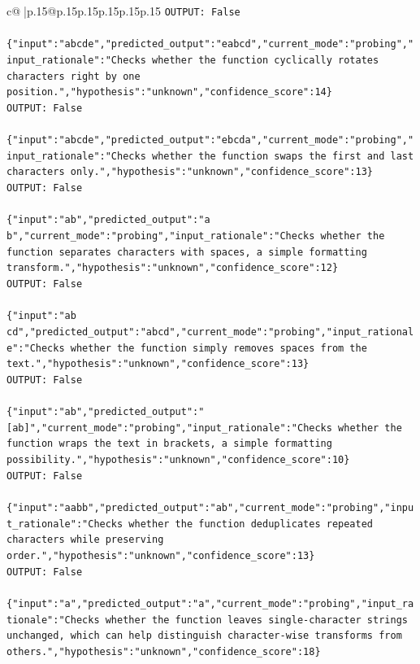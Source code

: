 \documentclass{article}
\begin{document}
{\begin{supertabular}{c@{$\;$}|p{.15\linewidth}@{}p{.15\linewidth}p{.15\linewidth}p{.15\linewidth}p{.15\linewidth}p{.15\linewidth}}
{{{\texttt{OUTPUT: False} \\
\\ 
\texttt{\{"input":"abcde","predicted\_output":"eabcd","current\_mode":"probing","input\_rationale":"Checks whether the function cyclically rotates characters right by one position.","hypothesis":"unknown","confidence\_score":14\}} \\
\texttt{OUTPUT: False} \\
\\ 
\texttt{\{"input":"abcde","predicted\_output":"ebcda","current\_mode":"probing","input\_rationale":"Checks whether the function swaps the first and last characters only.","hypothesis":"unknown","confidence\_score":13\}} \\
\texttt{OUTPUT: False} \\
\\ 
\texttt{\{"input":"ab","predicted\_output":"a b","current\_mode":"probing","input\_rationale":"Checks whether the function separates characters with spaces, a simple formatting transform.","hypothesis":"unknown","confidence\_score":12\}} \\
\texttt{OUTPUT: False} \\
\\ 
\texttt{\{"input":"ab cd","predicted\_output":"abcd","current\_mode":"probing","input\_rationale":"Checks whether the function simply removes spaces from the text.","hypothesis":"unknown","confidence\_score":13\}} \\
\texttt{OUTPUT: False} \\
\\ 
\texttt{\{"input":"ab","predicted\_output":"{[}ab{]}","current\_mode":"probing","input\_rationale":"Checks whether the function wraps the text in brackets, a simple formatting possibility.","hypothesis":"unknown","confidence\_score":10\}} \\
\texttt{OUTPUT: False} \\
\\ 
\texttt{\{"input":"aabb","predicted\_output":"ab","current\_mode":"probing","input\_rationale":"Checks whether the function deduplicates repeated characters while preserving order.","hypothesis":"unknown","confidence\_score":13\}} \\
\texttt{OUTPUT: False} \\
\\ 
\texttt{\{"input":"a","predicted\_output":"a","current\_mode":"probing","input\_rationale":"Checks whether the function leaves single{-}character strings unchanged, which can help distinguish character{-}wise transforms from others.","hypothesis":"unknown","confidence\_score":18\}} \\
}}}
\end{supertabular}}
\end{document}
